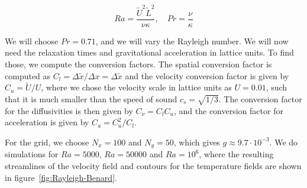 \begin{equation}
    \textit{Ra} = \frac{\widetilde{U}^2 \widetilde{L}^2}{\nu \kappa},\quad \textit{Pr} = \frac{\nu}{\kappa}
\end{equation}

We will choose $\textit{Pr} = 0.71$, and we will vary the Rayleigh number. We will now need the relaxation times and gravitational acceleration in lattice units. To find those, we compute the conversion factors. The spatial conversion factor is computed as $C_l = \Delta \widetilde{x} / \Delta x = \Delta \widetilde{x}$ and the velocity conversion factor is given by $C_u = \widetilde{U} / U$, where we chose the velocity scale in lattice units as $U = 0.01$, such that it is much smaller than the speed of sound $c_s = \sqrt{1/3}$. The conversion factor for the diffusivities is then given by $C_\nu = C_l C_u$, and the conversion factor for acceleration is given by $C_a = C_u^2 / C_l$. 

For the grid, we choose $N_x = 100$ and $N_y = 50$, which gives $g \approx 9.7 \cdot 10^{-3}$. We do simulations for $\textit{Ra} = 5000$, $\textit{Ra} = 50000$ and $\textit{Ra} = 10^6$, where the resulting streamlines of the velocity field and contours for the temperature fields are shown in figure~\ref{fig:Rayleigh-Benard}. 

